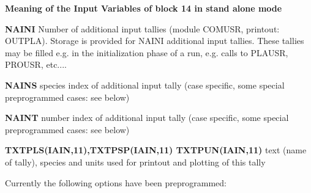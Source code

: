 {\bf Meaning of the Input Variables of block 14 in stand alone mode}

\medskip

\noindent

\begin{list}{ }{}
\item[{\bf NAINI }]
Number of additional input tallies (module COMUSR, printout: OUTPLA).
Storage is provided for NAINI additional input tallies. These tallies may be filled
e.g. in the initialization phase of a run, e.g. calls to PLAUSR, PROUSR, etc....
\item[{\bf NAINS }]
species index of additional input tally (case specific, some special preprogrammed cases: see below)
\item[{\bf NAINT }]
number index of additional input tally (case specific, some special preprogrammed cases: see below)
\item[{\bf TXTPLS(IAIN,11),TXTPSP(IAIN,11) TXTPUN(IAIN,11)  }]
text (name of tally), species and units used for printout and plotting of this tally
\end{list}
Currently the following options have been preprogrammed:

